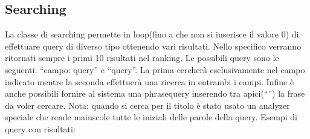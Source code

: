 \documentclass[12pt, letterpaper]{article}
\begin{document}
\subsection{Searching}
La classe di searching permette in loop(fino a che non si inserisce il valore 0) di effettuare query di diverso tipo ottenendo vari risultati. Nello specifico verranno ritornati sempre i primi 10 risultati nel ranking. Le possibili query sono le seguenti: “campo: query” e “query”. La prima cercherà esclusivamente nel campo indicato mentre la seconda effettuerà una ricerca in entrambi i campi. Infine è anche possibili fornire al sistema una phrasequery inserendo tra apici(“”) la frase da voler cercare. Nota: quando si cerca per il titolo è stato usato un analyzer speciale che rende maiuscole tutte le iniziali delle parole della query.
Esempi di query con risultati:
\end{document}

